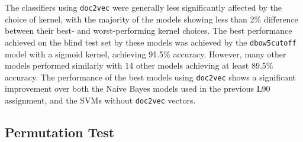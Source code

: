 \documentclass[twocolumn]{article}
\begin{document}
The classifiers using \texttt{doc2vec} were generally less significantly affected by the choice of kernel, with the majority of the models showing less than 2\% difference between their best- and worst-performing kernel choices. The best performance achieved on the blind test set by these models was achieved by the \texttt{dbow5cutoff} model with a sigmoid kernel, achieving 91.5\% accuracy. However, many other models performed similarly with 14 other models achieving at least 89.5\% accuracy. The performance of the best models using \texttt{doc2vec} shows a significant improvement over both the Naive Bayes models used in the previous L90 assignment, and the SVMs without \texttt{doc2vec} vectors.

\subsection{Permutation Test}
\end{document}
